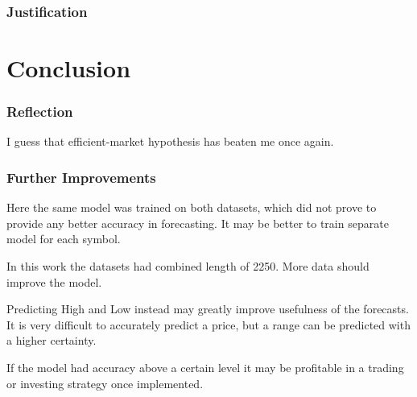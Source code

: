 \documentclass[a4paper,12pt]{article}
\begin{document}
\section{Justification}


\part{Conclusion}
\section{Reflection}
I guess that efficient-market hypothesis has beaten me once again.

\section{Further Improvements}
Here the same model was trained on both datasets, which did not prove to provide any better accuracy in forecasting.
It may be better to train separate model for each symbol.

In this work the datasets had combined length of 2250. More data should improve the model.

Predicting High and Low instead may greatly improve usefulness of the forecasts. It is very difficult to accurately predict a price, but a range can be predicted with a higher certainty.

If the model had accuracy above a certain level it may be profitable in a trading or investing strategy once implemented.

\end{document}
